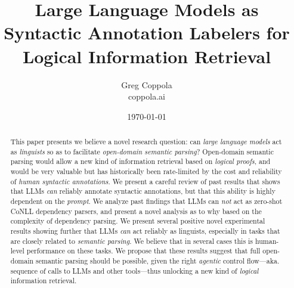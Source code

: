 \documentclass[11pt]{article}
\title{Large Language Models as Syntactic Annotation Labelers for Logical Information Retrieval}
\author{Greg Coppola\\coppola.ai}
\date{\today}
\begin{document}
\maketitle

\begin{abstract}
This paper presents we believe a novel research question: can \emph{large language models} act as \emph{linguists} so as to facilitate \emph{open-domain semantic parsing}?
Open-domain semantic parsing would allow a new kind of information retrieval based on \emph{logical proofs}, and would be very valuable but has historically been rate-limited by the cost and reliability of \emph{human syntactic annotations}.
We present a careful review of past results that shows that LLMs \emph{can} reliably annotate syntactic annotations, but that this ability is highly dependent on the \emph{prompt}.
We analyze past findings that LLMs can \emph{not} act as zero-shot CoNLL dependency parsers, and present a novel analysis as to why based on the complexity of dependency parsing.
We present several positive novel experimental results showing further that LLMs \emph{can} act reliably as linguists, especially in tasks that are closely related to \emph{semantic parsing}.
We believe that in several cases this is human-level performance on these tasks.
We propose that these results suggest that full open-domain semantic parsing should be possible, given the right \emph{agentic} control flow---aka. sequence of calls to LLMs and other tools---thus unlocking a new kind of \emph{logical} information retrieval.
\end{abstract}
\end{document}
